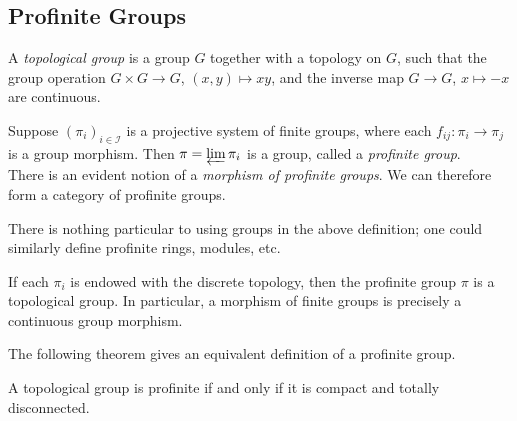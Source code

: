 \documentclass[11pt,openany]{book} %
\begin{document}

\subsection{Profinite Groups}
\begin{definition}
A \emph{topological group} is a group $G$ together with a topology on $G$, such that the group operation $G \times G \to G$, $(x,y) \mapsto xy$, and the inverse map $G \to G$, $x \mapsto -x$ are continuous.
\end{definition}

\begin{definition}
Suppose $(\pi_i)_{i \in \mathcal{I}}$ is a projective system of finite groups, where each $f_{ij} : \pi_i \to \pi_j$ is a group morphism. Then $\pi = \varprojlim \pi_i$ is a group, called a \emph{profinite group}.\\

There is an evident notion of a \emph{morphism of profinite groups}. We can therefore form a category of profinite groups.
\end{definition}

\begin{remark}
There is nothing particular to using groups in the above definition; one could similarly define profinite rings, modules, etc.
\end{remark}

\begin{lemma}
If each $\pi_i$ is endowed with the discrete topology, then the profinite group $\pi$ is a topological group. In particular, a morphism of finite groups is precisely a continuous group morphism.
\end{lemma}
\medskip

The following theorem gives an equivalent definition of a profinite group.\\

\begin{theorem} \label{profin}
A topological group is profinite if and only if it is compact and totally disconnected.
\end{theorem}
\end{document}
